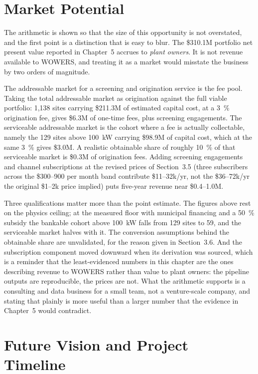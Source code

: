\documentclass[12pt,letterpaper]{report}
\begin{document}
\section{Market Potential}

The arithmetic is shown so that the size of this opportunity is not overstated, and
the first point is a distinction that is easy to blur. The \$310.1M portfolio net
present value reported in Chapter~5 accrues to \emph{plant owners}. It is not
revenue available to WOWERS, and treating it as a market would misstate the business
by two orders of magnitude.

The addressable market for a screening and origination service is the fee pool.
Taking the total addressable market as origination against the full viable
portfolio: 1,138 sites carrying \$211.3M of estimated capital cost, at a 3~\%
origination fee, gives \$6.3M of one-time fees, plus screening engagements. The
serviceable addressable market is the cohort where a fee is actually collectable,
namely the 129 sites above 100~kW carrying \$98.9M of capital cost, which at the same
3~\% gives \$3.0M. A realistic obtainable share of roughly 10~\% of that
serviceable market is \$0.3M of origination fees. Adding screening engagements and
channel subscriptions at the revised prices of Section~3.5 (three subscribers
across the \$300--900 per month band contribute \$11--32k/yr, not the
\$36--72k/yr the original \$1--2k price implied) puts five-year revenue near
\$0.4--1.0M.

Three qualifications matter more than the point estimate. The figures above rest on
the physics ceiling; at the measured floor with municipal financing and a 50~\%
subsidy the bankable cohort above 100~kW falls from 129 sites to 59, and the
serviceable market halves with it. The conversion assumptions behind the obtainable
share are unvalidated, for the reason given in Section~3.6. And the subscription
component moved downward when its derivation was sourced, which is a reminder that
the least-evidenced numbers in this chapter are the ones describing revenue to
WOWERS rather than value to plant owners: the pipeline outputs are reproducible,
the prices are not. What the arithmetic supports is a consulting and data business
for a small team, not a venture-scale company, and stating that plainly is more
useful than a larger number that the evidence in Chapter~5 would contradict.

\section{Future Vision and Project Timeline}
\end{document}
